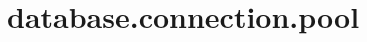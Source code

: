 \section{database.connection.pool}
\label{configuration:DatabaseConnectionPool}
\AvailableInJavaOnly{\TODO}